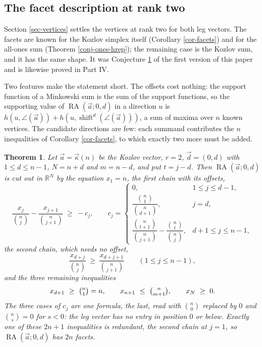 \documentclass[11pt, a4paper, abstract=yes]{scrartcl}
\theoremstyle{definition}
\theoremstyle{remark}
\theoremstyle{plain}
\newtheorem{theorem}[definition]{Theorem}
\newcommand{\shift}{\operatorname{shift}}
\newcommand{\rasimp}{\angle}
\newcommand{\RA}{\operatorname{RA}}
\newcommand{\kozvec}{\vec\kappa}
\newcommand{\leanpartial}{\tikz[baseline=-0.6ex]{\fill[leanfull] (0,-0.6ex) arc (-90:90:0.6ex) -- cycle;\draw[leanfull,line width=0.5pt] (0,0) circle (0.6ex);}}
\newcommand{\compmark}{\tikz[baseline=-0.6ex]\fill[compmark] (-0.55ex,-0.55ex) rectangle (0.55ex,0.55ex);}
\newcommand{\leanmark}[1]{\leavevmode{\reversemarginpar\marginnote{\raggedleft#1}}}
\let\autocite\cite
\begin{document}
\subsection{The facet description at rank two}
\label{sec-hrep2}
Section \ref{sec-vertices} settles the vertices at rank two for both leg vectors. The facets are known
for the Kozlov simplex itself (Corollary \ref{cor-facets}) and for the all-ones sum
(Theorem \ref{conj-ones-hrep}); the remaining case is the Kozlov sum, and it has the same shape. It was
Conjecture \ref{conj:kozlov-hrep2} of the first version of this paper and is likewise proved in Part IV.

Two features make the statement short. The offsets cost nothing: the support function of a Minkowski
sum is the sum of the support functions, so the supporting value of \(\RA(\vec a;0,d)\) in a
direction \(u\) is
\(h(u,\rasimp(\vec a))+h(u,\shift^d(\rasimp(\vec a)))\), a sum of maxima over \(n\) known vertices. The
candidate directions are few: each summand contributes the \(n\) inequalities of Corollary
\ref{cor-facets}, to which exactly two more must be added.

\begin{theorem}
\leanmark{\leanpartial\,\compmark}\relax \autocite{SnellmanArticle4}
Let \(\vec a=\kozvec(n)\) be the Kozlov vector, \(r=2\), \(\vec d=(0,d)\) with \(1\le d\le n-1\),
\(N=n+d\) and \(m=n-d\), and put \(t=j-d\). Then \(\RA(\vec a;0,d)\) is cut out in \(\mathbb R^N\) by
the equation \(x_1=n\), the first chain with its offsets,
\begin{equation}\label{eq:kozlov-hrep2}
  \frac{x_j}{\binom nj}-\frac{x_{j+1}}{\binom n{j+1}}\ \ge\ -c_j,\qquad
  c_j=\begin{cases}
    0, & 1\le j\le d-1,\\[2pt]
    \dfrac{\binom n1}{\binom n{d+1}}, & j=d,\\[6pt]
    \dfrac{\binom n{t+1}}{\binom n{j+1}}-\dfrac{\binom nt}{\binom nj}, & d+1\le j\le n-1,
  \end{cases}
\end{equation}
the second chain, which needs no offset,
\begin{equation}\label{eq:kozlov-hrep2-second}
  \frac{x_{d+j}}{\binom nj}\ \ge\ \frac{x_{d+j+1}}{\binom n{j+1}}\qquad(1\le j\le n-1),
\end{equation}
and the three remaining inequalities
\begin{equation}\label{eq:kozlov-hrep2-extras}
  x_{d+1}\ \ge\ \tbinom n1=n,\qquad x_{n+1}\ \le\ \tbinom n{m+1},\qquad x_N\ \ge\ 0 .
\end{equation}
The three cases of \(c_j\) are one formula, the last, read with \(\binom n0\) replaced by \(0\) and
\(\binom ns=0\) for \(s<0\): the leg vector has no entry in position \(0\) or below. Exactly one of
these \(2n+1\) inequalities is redundant, the second chain at \(j=1\), so
\(\RA(\vec a;0,d)\) has
\(2n\) facets.
\label{conj:kozlov-hrep2}
\label{conj-kozlov-hrep2}
\end{theorem}
\end{document}
